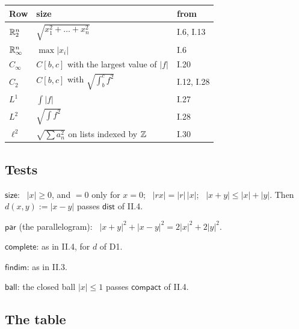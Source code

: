 \begin{center}
\renewcommand{\arraystretch}{1.3}
{\small
\begin{tabular}{@{}>{\raggedright\arraybackslash}p{3.6cm} >{\raggedright\arraybackslash}p{6.8cm} l@{}}
\textbf{Row} & \textbf{size} & \textbf{from} \\ \hline
$\mathbb{R}^n_2$ & $\sqrt{x_1^2 + \dots + x_n^2}$ & I.6, I.13 \\
$\mathbb{R}^n_\infty$ & $\max |x_i|$ & I.6 \\
$C_\infty$ & $C[b,c]$ with the largest value of $|f|$ & I.20 \\
$C_2$ & $C[b,c]$ with $\sqrt{\int_b^c f^2}$ & I.12, I.28 \\
$L^1$ & $\int |f|$ & I.27 \\
$L^2$ & $\sqrt{\int f^2}$ & I.28 \\
$\ell^2$ & $\sqrt{\sum a_n^2}$ on lists indexed by $\mathbb{Z}$ & I.30 \\
\end{tabular}
}
\end{center}

\subsection*{Tests}

\begin{lines}
\item[\lab{D1}] $\mathsf{size}$: \ $|x| \ge 0$, and $= 0$ only for $x = 0$; \ $|rx| = |r|\,|x|$; \ $|x + y| \le |x| + |y|$. Then $d(x, y) := |x - y|$ passes $\mathsf{dist}$ of II.4.
\item[\lab{D2}] $\mathsf{par}$ (the parallelogram): \ $|x + y|^2 + |x - y|^2 = 2|x|^2 + 2|y|^2$.
\item[\lab{D3}] $\mathsf{complete}$: as in II.4, for $d$ of D1.
\item[\lab{D4}] $\mathsf{findim}$: as in II.3.
\item[\lab{D5}] $\mathsf{ball}$: the closed ball $|x| \le 1$ passes $\mathsf{compact}$ of II.4.
\end{lines}

\subsection*{The table}

